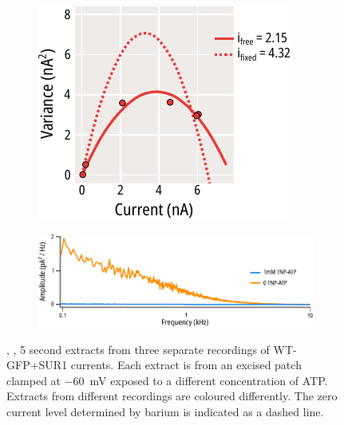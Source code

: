 \begin{figure}[hbtp]
\begin{subfigure}[t]{0.3\textwidth}
	\end{subfigure}
	\hfill
	\begin{subfigure}[t]{0.3\textwidth}
		\caption{}\label{ch4fig:noise_example_fits_3}
		\centering
		\includegraphics[width=\textwidth]{noise_example_fits_3.pdf}
	\end{subfigure}
	\vfill
	\begin{subfigure}[t]{0.5\textwidth}
		\caption{}\label{ch4fig:spectra_converge}
		\centering
		\includegraphics[width=\textwidth]{spectra_converge.pdf}
	\end{subfigure}
	\caption[Systematic underestimation of single channel currents]{
	{\bf{}}
	, ,  5 second extracts from three separate recordings of WT-GFP+SUR1 currents.
	Each extract is from an excised patch clamped at \SI{-60}{\milli\volt} exposed to a different concentration of ATP.
	Extracts from different recordings are coloured differently.
	The zero current level determined by barium is indicated as a dashed line.
}
\end{figure}
